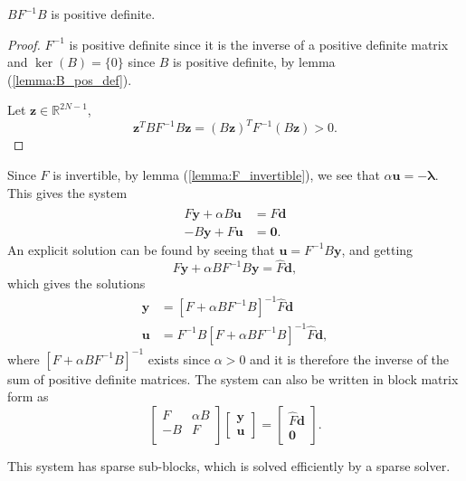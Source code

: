 \begin{lemma}
    $BF^{-1}B$ is positive definite.
\end{lemma}
\begin{proof}
    $F^{-1}$ is positive definite since it is the inverse of a positive definite matrix and $\ker(B) = \{0\}$ since $B$ is positive definite, by lemma (\ref{lemma:B_pos_def}).
    
    Let $\mathbf{z} \in \mathds{R}^{2N-1}$,
    $$\mathbf{z}^T BF^{-1}B \mathbf{z} = (B\mathbf{z})^T F^{-1}(B\mathbf{z}) > 0.$$
\end{proof}
Since $F$ is invertible, by lemma (\ref{lemma:F_invertible}), we see that $\alpha \mathbf{u}= -\mathbf{\lambda}$. 
This gives the system
\begin{align}
    \label{eq:lagrange_conditions}
     F \mathbf{y} + \alpha B \mathbf{u} &= \hat{F}\mathbf{d} \\
    -B \mathbf{y} + F \mathbf{u} &= \mathbf{0}.
\end{align}
An explicit solution can be found by seeing that $\mathbf{u}=F^{-1}B \mathbf{y}$, and getting
$$ F\mathbf{y} + \alpha B F^{-1}B \mathbf{y} = \hat{F}\mathbf{d},$$
which gives the solutions
\begin{align}
    \mathbf{y} &= \left[F + \alpha B F^{-1}B \right]^{-1} \hat{F}\mathbf{d} \\
    \mathbf{u} &= F^{-1} B \left[F + \alpha B F^{-1}B \right]^{-1} \hat{F}\mathbf{d},
\end{align}
where $\left[F + \alpha B F^{-1}B \right]^{-1}$ exists since $\alpha > 0$ and it is therefore the inverse of the sum of positive definite matrices.
The system can also be written in block matrix form as
\begin{equation}
\begin{bmatrix}
   F & \alpha B \\
   -B & F \\
\end{bmatrix}
\begin{bmatrix}
    \mathbf{y} \\
    \mathbf{u}
\end{bmatrix}
= 
\begin{bmatrix} \hat{F}\mathbf{d} \\
    \mathbf{0}
\end{bmatrix}.
\end{equation}

This system has sparse sub-blocks, which is solved
efficiently by a sparse solver.

